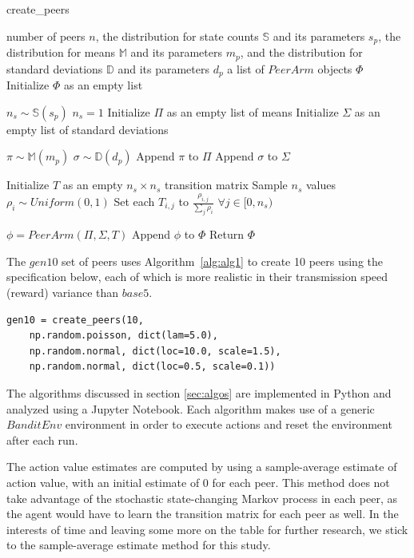 \documentclass{article}
\begin{document}
\begin{algorithm}[tb]
    \caption{create\_peers}
    \label{alg:alg1}
\begin{algorithmic}
     number of peers $n$, the distribution for state counts $\mathbb{S}$ and its parameters $s_p$, the distribution for means $\mathbb{M}$ and 
    its parameters $m_p$, and the distribution for standard deviations $\mathbb{D}$ and its parameters $d_p$
     a list of $PeerArm$ objects $\Phi$
    \STATE Initialize $\Phi$ as an empty list
    
    \STATE $n_s \sim \mathbb{S}(s_p)$
    \STATE $n_s = 1$
    \ENDIF
    \STATE Initialize $\Pi$ as an empty list of means
    \STATE Initialize $\Sigma$ as an empty list of standard deviations

    \STATE $\pi \sim \mathbb{M}(m_p)$
    \STATE $\sigma \sim \mathbb{D}(d_p)$
    \STATE Append $\pi$ to $\Pi$
    \STATE Append $\sigma$ to $\Sigma$
    \ENDFOR

    \STATE Initialize $T$ as an empty $n_s \times n_s$ transition matrix
    \STATE Sample $n_s$ values $\rho_i \sim Uniform(0, 1)$
    \STATE Set each $T_{i,j}$ to $\frac{\rho_{i,j}}{\sum_j\rho_i}$ $\forall j \in [0, n_s)$
    \ENDFOR

    \STATE $\phi = PeerArm(\Pi, \Sigma, T)$
    \STATE Append $\phi$ to $\Phi$
    \ENDFOR
    \STATE Return $\Phi$
\end{algorithmic}
\end{algorithm}

The $gen10$ set of peers uses Algorithm~\ref{alg:alg1} to create 10 peers using the specification below, each of which is more realistic in their transmission 
speed (reward) variance than $base5$.
\begin{lstlisting}
gen10 = create_peers(10, 
    np.random.poisson, dict(lam=5.0), 
    np.random.normal, dict(loc=10.0, scale=1.5), 
    np.random.normal, dict(loc=0.5, scale=0.1))
\end{lstlisting}

The algorithms discussed in section \ref{sec:algos} are implemented in Python and analyzed using a Jupyter Notebook. Each algorithm makes use of a generic $BanditEnv$ 
environment in order to execute actions and reset the environment after each run. 

The action value estimates are computed by using a sample-average estimate of action value, with an initial estimate of 0 for each peer. This method does not take 
advantage of the stochastic state-changing Markov process in each peer, as the agent would have to learn the transition matrix for each peer as well. In the interests of 
time and leaving some more on the table for further research, we stick to the sample-average estimate method for this study.
\end{document}
